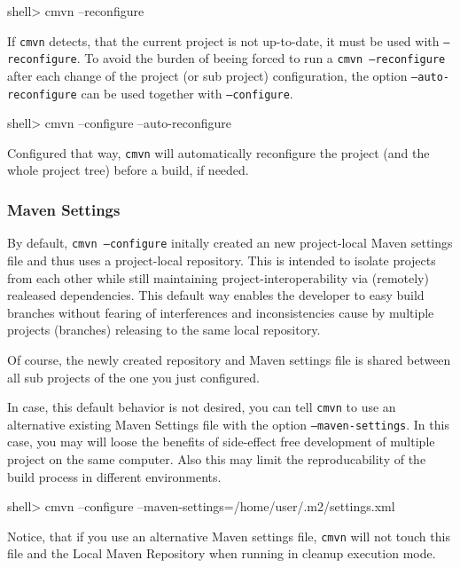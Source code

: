 \documentclass[a4paper,11pt,english,oneside,halfparskip]{scrartcl}
\newcommand{\cmvn}{\texttt{cmvn}}
\newcommand{\code}[1]{\texttt{#1}}
\begin{document}
\begin{Cmdline}
shell> cmvn --reconfigure
\end{Cmdline}

If \cmvn{} detects, that the current project is not up-to-date, it must be used with \code{--reconfigure}. To avoid the burden of beeing forced to run a \code{cmvn --reconfigure} after each change of the project (or sub project) configuration, the option \code{--auto-reconfigure} can be used together with \code{--configure}. 

\begin{Cmdline}
shell> cmvn --configure --auto-reconfigure
\end{Cmdline}

Configured that way, \cmvn{} will automatically reconfigure the project (and the whole project tree) before a build, if needed.

\subsubsection{Maven Settings}

By default, \code{cmvn --configure} initally created an new project-local Maven settings file and thus uses a project-local repository. This is intended to isolate projects from each other while still maintaining project-interoperability via (remotely) realeased dependencies. This default way enables the developer to easy build branches without fearing of interferences and inconsistencies cause by multiple projects (branches) releasing to the same local repository. 

Of course, the newly created repository and Maven settings file is shared between all sub projects of the one you just configured.

In case, this default behavior is not desired, you can tell \cmvn{} to use an alternative existing Maven Settings file with the option \code{--maven-settings}. In this case, you may will loose the benefits of side-effect free development of multiple project on the same computer. Also this may limit the reproducability of the build process in different environments. 

\begin{Cmdline}
shell> cmvn --configure --maven-settings=/home/user/.m2/settings.xml
\end{Cmdline}


Notice, that if you use an alternative Maven settings file, \cmvn{} will not touch this file and the Local Maven Repository when running in cleanup execution mode.
\end{document}

